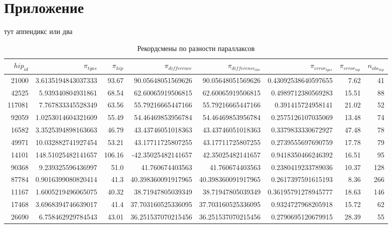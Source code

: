 \documentclass[14pt]{article} %
\begin{document}
\appendix

\section*{Приложение}
тут аппендикс или два 

\newpage
\begin{landscape}
\begin{spacing}{1.0}
\begin{table}[h]
\caption{Рекордсмены по разности параллаксов}
\label{tabular:75_25}
\begin{tabular}{|r|r|r|r|r|r|r|r|}
\hline 	
$hip_{id}$ &$\pi_{tgas}$ &$\pi_{hip}$ &$\pi_{difference}$ &$\pi_{difference_{abs}}$ &$\pi_{error_{tgas}}$ &$\pi_{error_{hip}}$ &$n_{obs_{hip}}$\\
\hline 
21000&3.6135194843037333&93.67&90.05648051569626&90.05648051569626&0.43092538640597655&7.62&41\\
42525&5.939340804931861&68.54&62.60065919506815&62.60065919506815&0.4989712380569283&15.51&88\\
117081&7.767833345528349&63.56&55.79216665447166&55.79216665447166&0.391415724958141&21.02&52\\
92059&1.0253014604321609&55.49&54.46469853956784&54.46469853956784&0.2575126107035069&13.48&74\\
16582&3.3525394898163663&46.79&43.43746051018363&43.43746051018363&0.3379833330672927&47.48&78\\
49971&10.032882741927454&53.21&43.17711725807255&43.17711725807255&0.2739555697690759&17.78&79\\
14101&148.51025482141657&106.16&-42.35025482141657&42.35025482141657&0.9418350466246392&16.51&95\\
90368&9.239325596436997&51.0&41.760674403563&41.760674403563&0.2380419233789036&10.37&128\\
87784&0.9016399080820414&41.3&40.398360091917965&40.398360091917965&0.2617397591615193&8.36&266\\
11167&1.6005219496065075&40.32&38.71947805039349&38.71947805039349&0.36195791278945777&18.63&146\\
17468&3.6968394746639017&41.4&37.703160525336095&37.703160525336095&0.9324727968205918&15.72&62\\
26690&6.758462929784543&43.01&36.251537070215456&36.251537070215456&0.2790695120679915&28.39&55\\

\end{tabular}
\end{table}
\end{spacing}
\end{landscape}
\end{document}
